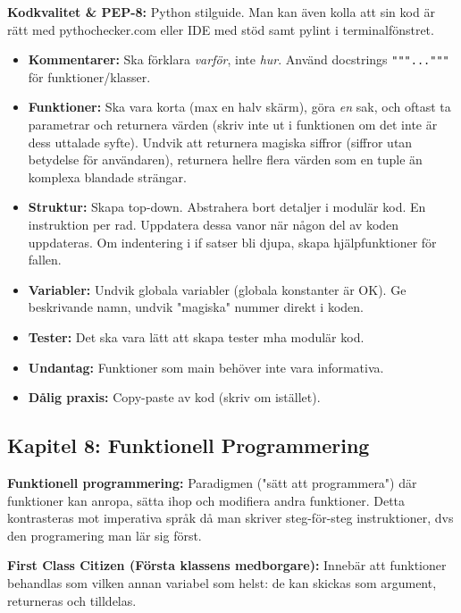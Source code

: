 \documentclass{article}
\begin{document}
\textbf{Kodkvalitet \& PEP-8:} Python stilguide. Man kan även kolla att sin kod är rätt med pythochecker.com eller IDE med stöd samt pylint i terminalfönstret.
\begin{itemize}
    \item \textbf{Kommentarer:} Ska förklara \textit{varför}, inte \textit{hur}. Använd docstrings \texttt{"""..."""} för funktioner/klasser.
    \item \textbf{Funktioner:} Ska vara korta (max en halv skärm), göra \textit{en} sak, och oftast ta parametrar och returnera värden (skriv inte ut i funktionen om det inte är dess uttalade syfte). Undvik att returnera magiska siffror (siffror utan betydelse för användaren), returnera hellre flera värden som en tuple än komplexa blandade strängar.
    \item \textbf{Struktur:} Skapa top-down. Abstrahera bort detaljer i modulär kod. En instruktion per rad. Uppdatera dessa vanor när någon del av koden uppdateras. Om indentering i if satser bli djupa, skapa hjälpfunktioner för fallen.
    \item \textbf{Variabler:} Undvik globala variabler (globala konstanter är OK). Ge beskrivande namn, undvik "magiska" nummer direkt i koden.
    \item \textbf{Tester:} Det ska vara lätt att skapa tester mha modulär kod.
    \item \textbf{Undantag:} Funktioner som main behöver inte vara informativa.
    \item \textbf{Dålig praxis:} Copy-paste av kod (skriv om istället).
\end{itemize}

\subsection*{Kapitel 8: Funktionell Programmering}

\textbf{Funktionell programmering:} Paradigmen ("sätt att programmera") där funktioner kan anropa, sätta ihop och modifiera andra funktioner. Detta kontrasteras mot imperativa språk då man skriver steg-för-steg instruktioner, dvs den programering man lär sig först.

\textbf{First Class Citizen (Första klassens medborgare):}
Innebär att funktioner behandlas som vilken annan variabel som helst: de kan skickas som argument, returneras och tilldelas.
\end{document}
